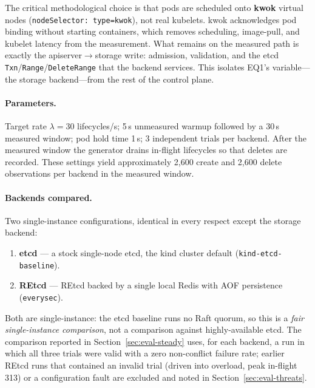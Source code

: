 The critical methodological choice is that pods are scheduled onto \textbf{kwok} virtual nodes (\texttt{nodeSelector: type=kwok}), not real kubelets. kwok acknowledges pod binding without starting containers, which removes scheduling, image-pull, and kubelet latency from the measurement. What remains on the measured path is exactly the apiserver$\rightarrow$storage write: admission, validation, and the etcd \texttt{Txn}/\texttt{Range}/\texttt{DeleteRange} that the backend services. This isolates EQ1's variable---the storage backend---from the rest of the control plane.

\paragraph{Parameters.}
Target rate $\lambda = 30$ lifecycles/s; 5\,s unmeasured warmup followed by a 30\,s measured window; pod hold time 1\,s; 3 independent trials per backend. After the measured window the generator drains in-flight lifecycles so that deletes are recorded. These settings yield approximately 2{,}600 create and 2{,}600 delete observations per backend in the measured window.

\paragraph{Backends compared.}
Two single-instance configurations, identical in every respect except the storage backend:

\begin{enumerate}
    \item \textbf{etcd} --- a stock single-node etcd, the kind cluster default (\texttt{kind-etcd-baseline}).
    \item \textbf{REtcd} --- REtcd backed by a single local Redis with AOF persistence (\texttt{everysec}).
\end{enumerate}

Both are single-instance: the etcd baseline runs no Raft quorum, so this is a \emph{fair single-instance comparison}, not a comparison against highly-available etcd. The comparison reported in Section~\ref{sec:eval-steady} uses, for each backend, a run in which all three trials were valid with a zero non-conflict failure rate; earlier REtcd runs that contained an invalid trial (driven into overload, peak in-flight 313) or a configuration fault are excluded and noted in Section~\ref{sec:eval-threats}.

